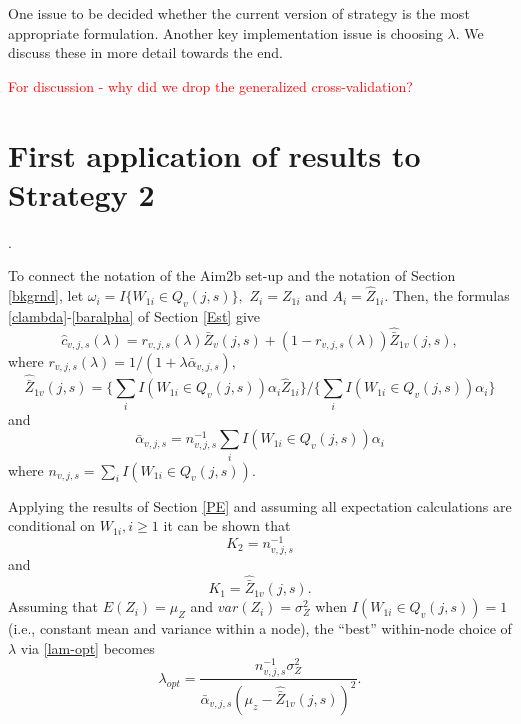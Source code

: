 \documentclass[12pt]{article}
\begin{document}
One issue to be decided whether the current version of strategy is the
most appropriate formulation. Another key implementation issue is
choosing $\lambda$. We discuss these in more detail towards the end.


\textcolor{red}{For discussion - why did we drop the generalized cross-validation?}




\section{First application of results to Strategy 2}.

To connect the notation of the Aim2b set-up and the notation of
Section \ref{bkgrnd}, let $\omega_i = I\{ W_{1i} \in Q_{v}(j,s) \},$
$Z_i = Z_{1i}$ and $A_i = \hat Z_{1i}$. Then, the formulas
\eqref{clambda}-\eqref{baralpha} of Section \ref{Est} give
 \[
\widehat{c}_{v,j,s}(\lambda) =
r_{v,j,s}(\lambda) \bar{Z}_v(j,s) + (1-r_{v,j,s}(\lambda)) \hat{\bar{Z}}_{1v}(j,s),
\]
where $r_{v,j,s}(\lambda) = 1/(1 + \lambda \bar{\alpha}_{v,j,s}),$
\[
\hat{\bar{Z}}_{1v}(j,s) =
\{ \sum_i I(W_{1i} \in Q_{v}(j,s)) \alpha_i  \hat{Z}_{1i} \}
/ \{ \sum_i I(W_{1i} \in Q_{v}(j,s)) \alpha_i \}
\]
and
\[
\bar{\alpha}_{v,j,s} = n^{-1}_{v,j,s} \sum_i I(W_{1i} \in Q_{v}(j,s))
\alpha_i
\]
where $n_{v,j,s} =  \sum_i I( W_{1i} \in Q_{v}(j,s) ).$

Applying the results of Section \ref{PE} and assuming all expectation
calculations are conditional on $W_{1i}, i \geq 1$ it can be shown that
\[
K_2 = n^{-1}_{v,j,s}
\]
and
\[
K_1 = \hat{\bar{Z}}_{1v}(j,s).
\]
Assuming that $E(Z_i) = \mu_Z$ and $var(Z_i) = \sigma^2_Z$ when $I(
W_{1i} \in Q_{v}(j,s) ) =1$ (i.e., constant mean and variance within a
node), the ``best'' within-node choice of $\lambda$ via
\eqref{lam-opt} becomes
\begin{equation}
\lambda_{opt} = \frac{n^{-1}_{v,j,s} \sigma^2_Z}{ \bar{\alpha}_{v,j,s} (\mu_z -  \hat{\bar{Z}}_{1v}(j,s))^2}.
\end{equation}
\end{document}
